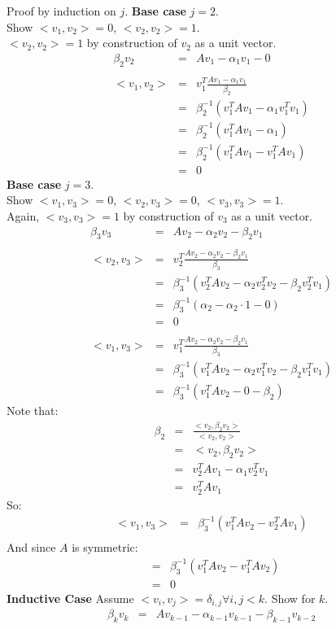 \documentclass{article}
\newcommand{\ea}[1]{\begin{eqnarray*}#1\end{eqnarray*}}
\begin{document}
 Proof by induction on $j$.  \textbf{Base case} $j=2$. \\
Show $<v_1,v_2>=0$, $<v_2,v_2>=1$. \\
$<v_2,v_2>=1$ by construction of $v_2$ as a unit vector.
\ea{ 
	\beta_2 v_2 &=& A v_1 - \alpha_1 v_1 - 0 \\
	\\
	<v_1,v_2> &=& v_1^T \frac{A v_1 - \alpha_1 v_1} { \beta_2 } \\
	&=& \beta_2^{-1}\left( v_1^T A v_1 - \alpha_1 v_1^Tv_1 \right) \\
	&=& \beta_2^{-1}\left( v_1^T A v_1 - \alpha_1 \right) \\
	&=& \beta_2^{-1}\left( v_1^T A v_1 - v_1^T A v_1 \right) \\
	&=& 0
}
\textbf{Base case} $j=3$. \\
Show $<v_1,v_3>=0$, $<v_2,v_3>=0$, $<v_3,v_3>=1$. \\
Again, $<v_3,v_3>=1$ by construction of $v_3$ as a unit vector.
\ea{
	\beta_3 v_3 &=& A v_2 - \alpha_2 v_2 - \beta_2 v_1 \\
	\\
	<v_2,v_3> &=& v_2^T\frac{A v_2 - \alpha_2 v_2 - \beta_2 v_1} { \beta_3 } \\
	&=& \beta_3^{-1}\left( v_2^T A v_2 - \alpha_2 v_2^T v_2 - \beta_2 v_2^T v_1 \right) \\
	&=& \beta_3^{-1}\left( \alpha_2 - \alpha_2 \cdot 1 - 0 \right) \\
	&=& 0 \\
	\\
	<v_1,v_3> &=& v_1^T\frac{A v_2 - \alpha_2 v_2 - \beta_2 v_1} { \beta_3 } \\
	&=& \beta_3^{-1}\left( v_1^T A v_2 - \alpha_2 v_1^T v_2 - \beta_2 v_1^T v_1 \right) \\
	&=& \beta_3^{-1}\left( v_1^T A v_2 - 0 - \beta_2 \right) 
}
Note that:
\ea{
	\beta_2 &=& \frac{<v_2,\beta_2 v_2>}{<v_2,v_2>} \\
	&=& <v_2,\beta_2 v_2>\\
	&=& v_2^T A v_1 - \alpha_1 v_2^T v_1 \\
	&=& v_2^T A v_1
}
So:
\ea{
	<v_1,v_3> &=& \beta_3^{-1}\left( v_1^T A v_2 - v_2^T A v_1 \right)\\
}
And since $A$ is symmetric:
\ea{
	&=& \beta_3^{-1}\left( v_1^T A v_2 - v_1^T A v_2 \right)\\
	&=& 0
}
\textbf{Inductive Case} Assume $<v_i,v_j>=\delta_{i,j} \forall i,j < k$.  Show
for $k$.
\ea{
	\beta_k v_k &=&  A v_{k-1} - \alpha_{k-1}v_{k-1}-\beta_{k-1}v_{k-2}
}
\end{document}
